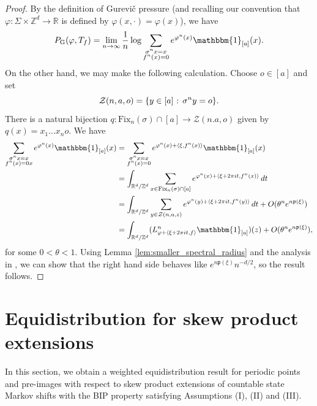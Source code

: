\documentclass[11pt,letterpaper]{amsart}
\theoremstyle{definition}
\numberwithin{equation}{section}
\numberwithin{theorem}{section}
\def\Z{\mathbb{Z}}
\def\R{\mathbb{R}}
\def\vp{\varphi}
\def\R{\mathbb R}
\def\Z{\mathbb Z}
\def\PG{P_{\mathrm{G}}}
\begin{document}
\begin{proof}
By the definition of Gurevi\v{c} pressure (and recalling our convention that $\vp : \Sigma \times \Z^d \to \R$
is defined by $\vp(x,\cdot)=\vp(x)$), we have
\[
\PG(\vp,T_f)
= \lim_{n \to \infty} \frac{1}{n} \log \sum_{\substack{\sigma^nx=x \\ f^n(x)=0}}
e^{\vp^n(x)} \mathbbm{1}_{[a]}(x).
\]
On the other hand, we may make the following calculation. Choose $o \in [a]$ and set
\[
\mathcal Z(n,a,o) = \{y \in [a] \hbox{ : } \sigma^ny=o\}.
\]
There is a natural bijection $q : \mathrm{Fix}_n(\sigma) \cap [a] \to \mathcal Z(n.a,o)$ given by
$q(x) = x_1\ldots x_no$.
We have
\begin{align*}
\sum_{\substack{\sigma^nx=x \\ f^n(x)=0x}} e^{\vp^n(x)} \mathbbm{1}_{[a]}(x)
&=\sum_{\substack{\sigma^nx=x \\ f^n(x)=0}} e^{\vp^n(x)+\langle \xi,f^n(x)\rangle} \mathbbm{1}_{[a]}(x)
\\
&= \int_{\R^d/\Z^d} \sum_{x \in \mathrm{Fix}_n(\sigma) \cap [a]}
e^{\vp^n(x)+\langle \xi+2\pi it,f^n(x)\rangle} \, dt
\\
&= \int_{\R^d/\Z^d} \sum_{y \in \mathcal Z(n,a,z)} e^{\vp^n(y)+\langle \xi+2\pi it,f^n(y)\rangle} \, dt
+ O(\theta^n e^{n\mathfrak p(\xi)})
\\
&=
\int_{\R^d/\Z^d} (L^n_{\vp+\langle \xi+2\pi i t,f\rangle} \mathbbm{1}_{[a]})(z)
+ O(\theta^n e^{n\mathfrak p(\xi)}),
\end{align*}
for some $0<\theta<1$. Using Lemma \ref{lem:smaller_spectral_radius} and the analysis in \cite{PS94}, we can show that
the right hand side behaves like $e^{n\mathfrak p(\xi)} n^{-d/2}$, so the result follows.
\end{proof}




\section{Equidistribution for skew product extensions}\label{sec:equi_for_skew}
In this section, we obtain a weighted equidistribution result for periodic points and pre-images with respect to
skew product extensions  of countable state Markov shifts with the BIP property satisfying Assumptions (I), (II) and (III).
\end{document}
